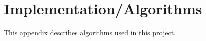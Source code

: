 \chapter{Implementation/Algorithms}
\label{ap:Algorithms}
\graphicspath{{Appendix4/Appendix4figures/}}

This appendix describes algorithms used in this project.

